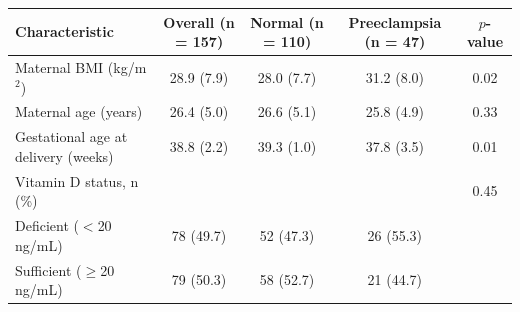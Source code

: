 
\begin{tabular}{lcccc}
\toprule
Characteristic & Overall (n = 157) & Normal (n = 110) & Preeclampsia (n = 47) & $p$-value\\
\midrule
Maternal BMI (kg/m$^2$) & 28.9 (7.9) & 28.0 (7.7) & 31.2 (8.0) & 0.02\\
Maternal age (years) & 26.4 (5.0) & 26.6 (5.1) & 25.8 (4.9) & 0.33\\
Gestational age at delivery (weeks) & 38.8 (2.2) & 39.3 (1.0) & 37.8 (3.5) & 0.01\\
Vitamin D status, n (\%) &  &  &  & 0.45\\
\quad Deficient ($<$20 ng/mL) & 78 (49.7) & 52 (47.3) & 26 (55.3) & \\
\quad Sufficient ($\geq$20 ng/mL) & 79 (50.3) & 58 (52.7) & 21 (44.7) & \\
\bottomrule
\end{tabular}
